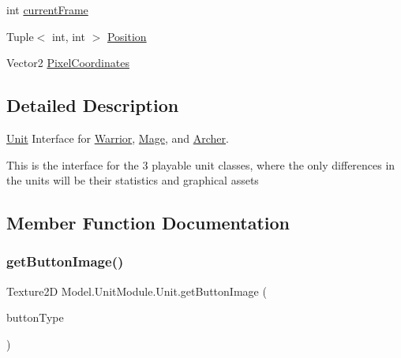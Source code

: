 \begin{DoxyCompactItemize}
\item 
int \hyperlink{interface_model_1_1_unit_module_1_1_unit_ad882bd1108f451dfbfdcfd5fa66a5fcd}{current\+Frame}
\item 
Tuple$<$ int, int $>$ \hyperlink{interface_model_1_1_unit_module_1_1_unit_ad27310abf1f0ffb35774c6a4ec4a923b}{Position}
\item 
Vector2 \hyperlink{interface_model_1_1_unit_module_1_1_unit_a6e4318baed5214203b0af5edd7e0deab}{Pixel\+Coordinates}
\end{DoxyCompactItemize}


\subsection{Detailed Description}
\hyperlink{interface_model_1_1_unit_module_1_1_unit}{Unit} Interface for \hyperlink{class_model_1_1_unit_module_1_1_warrior}{Warrior}, \hyperlink{class_model_1_1_unit_module_1_1_mage}{Mage}, and \hyperlink{class_model_1_1_unit_module_1_1_archer}{Archer}. 

This is the interface for the 3 playable unit classes, where the only differences in the units will be their statistics and graphical assets 

\subsection{Member Function Documentation}
\hypertarget{interface_model_1_1_unit_module_1_1_unit_ac8e47a3f8d13fe8a719f962a3ee9ee46}{}\label{interface_model_1_1_unit_module_1_1_unit_ac8e47a3f8d13fe8a719f962a3ee9ee46} 
\subsubsection{\texorpdfstring{get\+Button\+Image()}{getButtonImage()}}
{\footnotesize\ttfamily Texture2D Model.\+Unit\+Module.\+Unit.\+get\+Button\+Image (\begin{DoxyParamCaption}\item[{\hyperlink{namespace_model_ac76b3489c9d704f49912608bd36cd0e7}{Button\+Type}}]{button\+Type }\end{DoxyParamCaption})}

